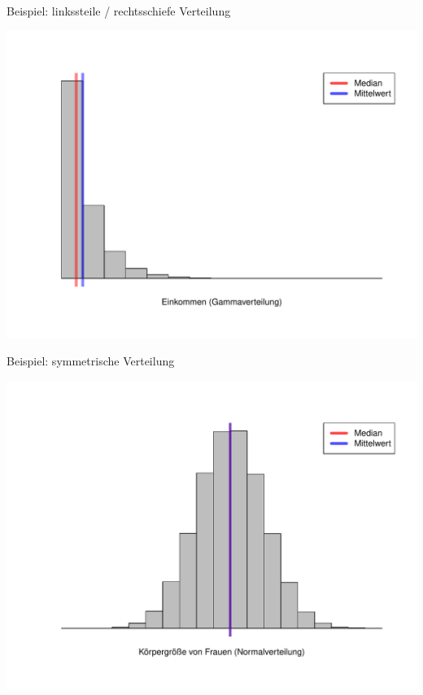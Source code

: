 \documentclass[t,11pt,aspectratio=169]{beamer}
\begin{document}
\begin{frame}
    Beispiel: linkssteile / rechtsschiefe Verteilung
    \vspace{-0.7cm}
	\begin{center}
		\includegraphics[scale=0.5]{1.pdf}
	\end{center}
\end{frame}

\begin{frame}
	Beispiel: symmetrische Verteilung
	\vspace{-0.7cm}
	\begin{center}
		\includegraphics[scale=0.5]{2.pdf}
	\end{center}
\end{frame}
\end{document}
